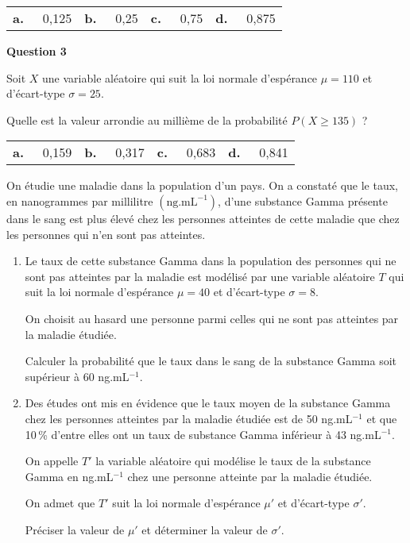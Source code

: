 \documentclass[12pt,french]{article}
\begin{document}
\begin{question}[subtitle={Métropole septembre 2015}]
\medskip
\begin{tabularx}{\linewidth}{*{4}{X}}
\textbf{a.~~} 0,125&\textbf{b.~~} 0,25&\textbf{c.~~} 0,75 &\textbf{d.~~} 0,875
\end{tabularx}
\medskip

\textbf{Question 3}

Soit $X$ une variable aléatoire qui suit la loi normale d'espérance $\mu = 110$ et d'écart-type $\sigma = 25$.

Quelle est la valeur arrondie au millième de la probabilité $P( X \geqslant 135)$ ?

\medskip
\begin{tabularx}{\linewidth}{*{4}{X}}
\textbf{a.~~} 0,159&\textbf{b.~~} 0,317 &\textbf{c.~~} 0,683 &\textbf{d.~~} 0,841
\end{tabularx}
\medskip
\end{question}

\begin{question}[subtitle={Polynésie septembre 2015}]
On étudie une maladie dans la population d'un pays. On a constaté que le taux, en nanogrammes
par millilitre $\left(\text{ng.mL}^{-1}\right)$, d'une substance Gamma présente dans le sang est plus élevé chez les personnes atteintes de cette maladie que chez les personnes qui n'en sont pas
atteintes.

\medskip

\begin{enumerate}
\item Le taux de cette substance Gamma dans la population des personnes qui ne sont pas
atteintes par la maladie est modélisé par une variable aléatoire $T$ qui suit la loi normale
d'espérance $\mu = 40$ et d'écart-type $\sigma = 8$.

On choisit au hasard une personne parmi celles qui ne sont pas atteintes par la maladie
étudiée.

Calculer la probabilité que le taux dans le sang de la substance Gamma soit supérieur
à 60 ng.mL$^{-1}$.
\item Des études ont mis en évidence que le taux moyen de la substance Gamma chez les
personnes atteintes par la maladie étudiée est de 50 ng.mL$^{-1}$ et que 10\,\% d'entre elles
ont un taux de substance Gamma inférieur à 43 ng.mL$^{-1}$.

On appelle $T'$ la variable aléatoire qui modélise le taux de la substance Gamma en
ng.mL$^{-1}$ chez une personne atteinte par la maladie étudiée.

On admet que $T'$ suit la loi normale d'espérance $\mu'$ et d'écart-type $\sigma'$.

Préciser la valeur de $\mu'$ et déterminer la valeur de $\sigma'$.
\end{enumerate}
\end{question}
\end{document}
